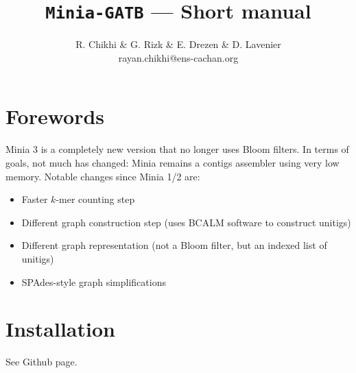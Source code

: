 \documentclass[a4paper]{article}
\begin{document}
\newcommand\vitem[1][]{\SaveVerb[%
    aftersave={\item[\textnormal{\UseVerb[#1]{vsave}}]}]{vsave}}

\title{\Huge \texttt{Minia-GATB} --- Short manual}

\author{R. Chikhi \& G. Rizk \& E. Drezen \& D. Lavenier\\
        {\small{rayan.chikhi@ens-cachan.org}}}
\maketitle

\begin{abstract}
\end{abstract}

\tableofcontents

\section{Forewords}

Minia 3 is a completely new version that no longer uses Bloom filters.
In terms of goals, not much has changed: Minia remains a contigs assembler using very low memory. Notable changes since Minia 1/2 are:
\begin{itemize}
    \item Faster $k$-mer counting step
    \item Different graph construction step (uses BCALM software to construct unitigs)
    \item Different graph representation (not a Bloom filter, but an indexed list of unitigs)
    \item SPAdes-style graph simplifications
\end{itemize}

\section{Installation}

See Github page.
\end{document}
